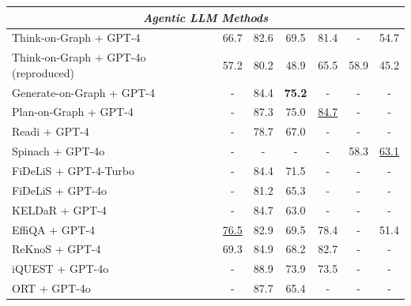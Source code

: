\documentclass[sigconf]{acmart}
\begin{document}
\begin{table}[t]
\begin{tabular}{lcccccc}
\multicolumn{7}{c}{\textit{Agentic LLM Methods}} \\
\midrule
Think-on-Graph + GPT-4 \citep{sun2024thinkongraph} & 66.7 & 82.6 & 69.5 & 81.4 & - & 54.7 \\
Think-on-Graph + GPT-4o (reproduced) & 57.2 & 80.2 & 48.9 & 65.5 & 58.9 & 45.2 \\
Generate-on-Graph + GPT-4 \citep{xu2024generate} & - & 84.4 & \textbf{75.2} & - & - & - \\
Plan-on-Graph + GPT-4 \citep{chen2024plan} & - & 87.3 & 75.0 & \underline{84.7} & - & - \\
Readi + GPT-4 \citep{cheng2024call} & - & 78.7 & 67.0 & - & - & - \\
Spinach + GPT-4o \citep{liu2024spinach} & - & - & - & - & 58.3 & \underline{63.1} \\
FiDeLiS + GPT-4-Turbo \citep{sui2024fidelis} & - & 84.4 & 71.5 & - & - & - \\
FiDeLiS + GPT-4o \citep{sui2024fidelis} & - & 81.2 & 65.3 & - & - & - \\
KELDaR + GPT-4 \citep{li2024framework} & - & 84.7 & 63.0 & - & - & - \\
EffiQA + GPT-4 \citep{dong-etal-2025-effiqa} & \underline{76.5} & 82.9 & 69.5 & 78.4 & - & 51.4 \\
ReKnoS + GPT-4 \citep{wang2025reasoning} & 69.3 & 84.9 & 68.2 & 82.7 & - & - \\
iQUEST + GPT-4o \citep{wang2025iquest} & - & 88.9 & 73.9 & 73.5 & - & - \\
ORT + GPT-4o \citep{liu2025ontology} & - & 87.7 & 65.4 & - & - & - \\

\end{tabular}
\end{table}
\end{document}
